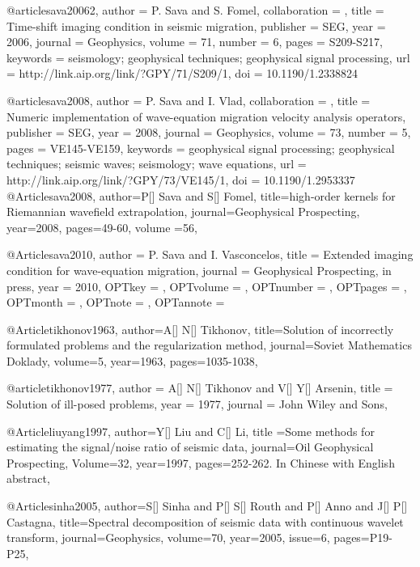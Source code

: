 @article{sava20062,
author = {P. Sava and S. Fomel},
collaboration = {},
title = {Time-shift imaging condition in seismic migration},
publisher = {SEG},
year = {2006},
journal = {Geophysics},
volume = {71},
number = {6},
pages = {S209-S217},
keywords = {seismology; geophysical techniques; geophysical signal processing},
url = {http://link.aip.org/link/?GPY/71/S209/1},
doi = {10.1190/1.2338824}
}

@article{sava2008,
author = {P. Sava and I. Vlad},
collaboration = {},
title = {Numeric implementation of wave-equation migration velocity analysis operators},
publisher = {SEG},
year = {2008},
journal = {Geophysics},
volume = {73},
number = {5},
pages = {VE145-VE159},
keywords = {geophysical signal processing; geophysical techniques; seismic waves; seismology; wave equations},
url = {http://link.aip.org/link/?GPY/73/VE145/1},
doi = {10.1190/1.2953337}
}
@Article{sava2008,
author={P[] Sava and S[] Fomel},
title={high-order kernels for Riemannian wavefield extrapolation},
journal={Geophysical Prospecting},
year=2008,
pages={49-60},
volume ={56},
}

@Article{sava2010,
  author = 	 {P. Sava and I. Vasconcelos},
  title = 	 {Extended imaging condition for wave-equation migration},
  journal = 	 {Geophysical Prospecting, in press},
  year = 	 {2010},
  OPTkey = 	 {},
  OPTvolume = 	 {},
  OPTnumber = 	 {},
  OPTpages = 	 {},
  OPTmonth = 	 {},
  OPTnote = 	 {},
  OPTannote = 	 {}
}



@Article{tikhonov1963,
author={A[] N[] Tikhonov},
title={Solution of incorrectly formulated problems and the regularization method},
journal={Soviet Mathematics Doklady},
volume=5,
year=1963,
pages={1035-1038},
}

@article{tikhonov1977,
  author =	 {A[] N[] Tikhonov and V[] Y[] Arsenin},
  title =	 {Solution of ill-posed problems},
  year =	 1977,
  journal =	 {John Wiley and Sons},
}

@Article{liuyang1997,
  author={Y[] Liu and C[] Li},
  title ={Some methods for estimating the signal/noise ratio of seismic data},
  journal={Oil Geophysical Prospecting},
  Volume=32,
  year=1997,
  pages={252-262. In Chinese with English abstract},
}

@Article{sinha2005,
author={S[] Sinha and P[] S[] Routh and P[] Anno and J[] P[] Castagna},
title={Spectral decomposition of seismic data with continuous wavelet transform},
journal={Geophysics},
volume=70,
year=2005,
issue=6,
pages={P19-P25},
}

